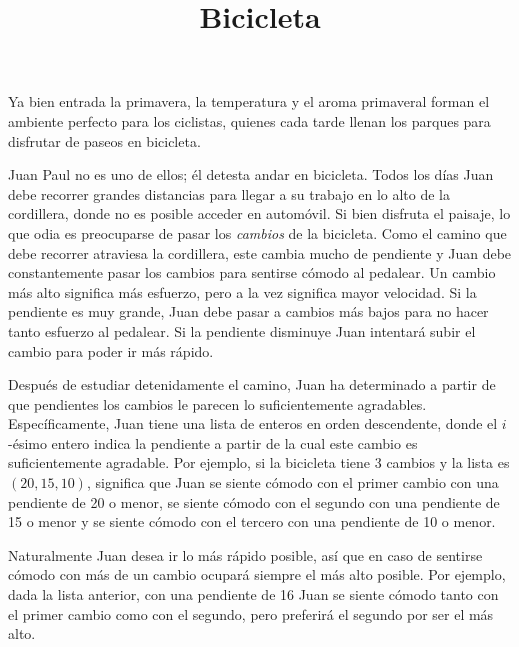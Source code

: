 \documentclass{oci}
\title{Bicicleta}
\begin{document}
\begin{problemDescription}
Ya bien entrada la primavera, la temperatura y el aroma primaveral forman el
ambiente perfecto para los ciclistas, quienes cada tarde llenan los parques para
disfrutar de paseos en bicicleta.

Juan Paul no es uno de ellos; él detesta andar en bicicleta.
Todos los días Juan debe recorrer grandes distancias para llegar a su trabajo en
lo alto de la cordillera, donde no es posible acceder en automóvil.
Si bien disfruta el paisaje, lo que odia es preocuparse de pasar los
\emph{cambios} de la bicicleta.
Como el camino que debe recorrer atraviesa la cordillera, este cambia
mucho de pendiente y Juan debe constantemente pasar los cambios para sentirse
cómodo al pedalear.
Un cambio más alto significa más esfuerzo, pero a la vez significa mayor
velocidad.
Si la pendiente es muy grande, Juan debe pasar a cambios más bajos para no hacer
tanto esfuerzo al pedalear.
Si la pendiente disminuye Juan intentará subir el cambio para poder ir
más rápido.

Después de estudiar detenidamente el camino, Juan ha determinado a partir de que
pendientes los cambios le parecen lo suficientemente agradables.
Específicamente, Juan tiene una lista de enteros en orden descendente, donde el
$i$-ésimo entero indica la pendiente a partir de la cual este cambio es
suficientemente agradable.
Por ejemplo, si la bicicleta tiene 3 cambios y la lista es $(20, 15, 10)$,
significa que Juan se siente cómodo con el primer cambio con una pendiente de
20 o menor, se siente cómodo con el segundo con una pendiente de 15 o
menor y se siente cómodo con el tercero con una pendiente de 10 o menor.

Naturalmente Juan desea ir lo más rápido posible, así que en caso de sentirse
cómodo con más de un cambio ocupará siempre el más alto posible.
Por ejemplo, dada la lista anterior, con una pendiente de 16 Juan se siente cómodo
tanto con el primer cambio como con el segundo, pero preferirá el segundo por
ser el más alto.


\end{problemDescription}
\end{document}
